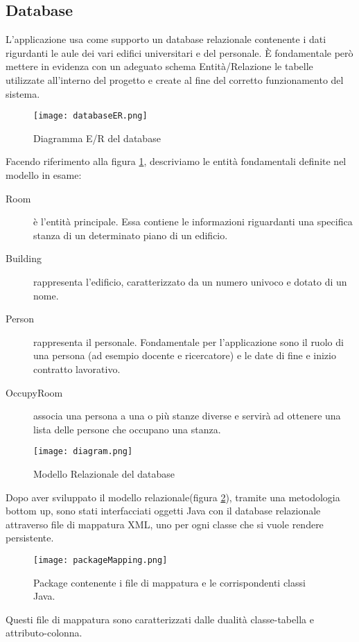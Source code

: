 \FloatBarrier
\subsection{Database}

L'applicazione usa come supporto un database relazionale contenente i dati rigurdanti le aule dei vari edifici universitari e del personale.
\`E fondamentale però mettere in evidenza con un adeguato schema Entità/Relazione le tabelle utilizzate all’interno del progetto e create al fine del corretto funzionamento del 
sistema.

\begin{figure}[!htb]
\centering
\texttt{[image: databaseER.png]}
\caption{Diagramma E/R del database}\label{fig:database}
\end{figure}

Facendo riferimento alla figura \ref{fig:database}, descriviamo le entità fondamentali definite nel modello in esame:
\FloatBarrier
\begin{description}
\item[Room]\`e l'entit\`a principale. Essa contiene le informazioni riguardanti una specifica stanza di un determinato piano di un edificio. 
\item[Building]rappresenta l'edificio, caratterizzato da un numero univoco e dotato di un nome.
\item[Person]rappresenta il personale. Fondamentale per l'applicazione sono il ruolo di una persona (ad esempio docente e ricercatore) e le date di fine e inizio contratto lavorativo.
\item[OccupyRoom]associa una persona a una o pi\`u stanze diverse e  servir\`a ad ottenere una lista delle persone che occupano una stanza.
\end{description}

\FloatBarrier
\begin{figure}[!htb]
\centering
\texttt{[image: diagram.png]}
\caption{Modello Relazionale del database}\label{fig:databaseRelaz}
\end{figure}
\FloatBarrier
Dopo aver sviluppato il modello relazionale(figura \ref{fig:databaseRelaz}), tramite una metodologia bottom up, sono stati interfacciati oggetti Java con il database relazionale attraverso file di mappatura XML, uno per ogni classe che si vuole rendere persistente.\\ 

\begin{figure}[!htb]
\centering
\texttt{[image: packageMapping.png]}
\caption{Package contenente i file di mappatura e le corrispondenti classi Java.}\label{fig:mappingPack}
\end{figure}
\FloatBarrier
Questi file di mappatura sono caratterizzati  dalle dualità classe-tabella e attributo-colonna.